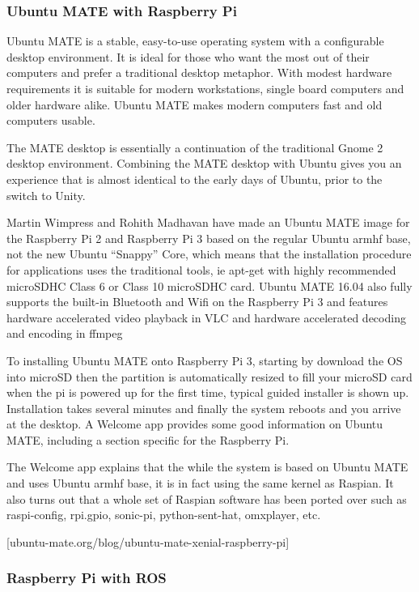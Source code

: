 	\subsubsection{Ubuntu MATE with Raspberry Pi}
	Ubuntu MATE is a stable, easy-to-use operating system with a configurable desktop environment. It is ideal for those who want the most out of their computers and prefer a traditional desktop metaphor. With modest hardware requirements it is suitable for modern workstations, single board computers and older hardware alike. Ubuntu MATE makes modern computers fast and old computers usable.
	
	The MATE desktop is essentially a continuation of the traditional Gnome 2 desktop environment. Combining the MATE desktop with Ubuntu gives you an experience that is almost identical to the early days of Ubuntu, prior to the switch to Unity.
	
	Martin Wimpress and Rohith Madhavan have made an Ubuntu MATE image for the Raspberry Pi 2 and Raspberry Pi 3 based on the regular Ubuntu armhf base, not the new Ubuntu “Snappy” Core, which means that the installation procedure for applications uses the traditional tools, ie apt-get with highly recommended microSDHC Class 6 or Class 10 microSDHC card. Ubuntu MATE 16.04 also fully supports the built-in Bluetooth and Wifi on the Raspberry Pi 3 and features hardware accelerated video playback in VLC and hardware accelerated decoding and encoding in ffmpeg
	
	To installing Ubuntu MATE onto Raspberry Pi 3, starting by download the OS into microSD then the partition is automatically resized to fill your microSD card when the pi is powered up for the first time, typical guided installer is shown up. Installation takes several minutes and finally the system reboots and you arrive at the desktop. A Welcome app provides some good information on Ubuntu MATE, including a section specific for the Raspberry Pi.
	
	The Welcome app explains that the while the system is based on Ubuntu MATE and uses Ubuntu armhf base, it is in fact using the same kernel as Raspian. It also turns out that a whole set of Raspian software has been ported over such as raspi-config, rpi.gpio, sonic-pi, python-sent-hat, omxplayer, etc.
	
	[ubuntu-mate.org/blog/ubuntu-mate-xenial-raspberry-pi]
	
	\subsubsection{Raspberry Pi with ROS} 
	
